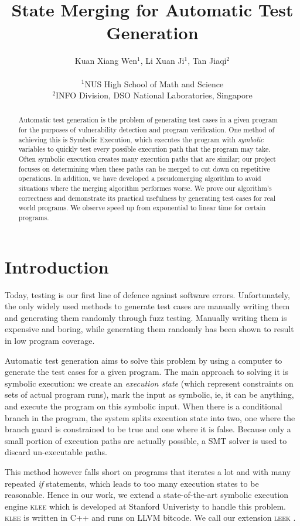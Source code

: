 \documentclass[12pt,a4paper]{article}
\title{State Merging for Automatic Test Generation}
\date{}
\author{
Kuan Xiang Wen$^{1}$, Li Xuan Ji$^{1}$, Tan Jiaqi$^{2}$\\
\vspace{1 mm} \\
\small{$^{1}$NUS High School of Math and Science}\\
\small{$^{2}$INFO Division, DSO National Laboratories, Singapore}
}
\newcommand{\klee}{\textsc{klee }}
\newcommand{\leek}{\textsc{leek }}
\begin{document}
\maketitle
\begin{abstract}
Automatic test generation is the problem of generating test cases in a given program for the purposes of vulnerability detection and program verification. One method of achieving this is Symbolic Execution, which executes the program with \emph{symbolic} variables to quickly test every possible execution path that the program may take. Often symbolic execution creates many execution paths that are similar; our project focuses on determining when these paths can be merged to cut down on repetitive operations. In addition, we have developed a pseudomerging algorithm to avoid situations where the merging algorithm performes worse. We prove our algorithm's correctness and demonstrate its practical usefulness by generating test cases for real world programs. We observe speed up from exponential to linear time for certain programs.
\end{abstract}

\section{Introduction}
Today, testing is our first line of defence against software errors. Unfortunately, the only widely used methods to generate test cases are manually writing them and generating them randomly through fuzz testing. Manually writing them is expensive and boring, while generating them randomly has been shown to result in low program coverage. 

Automatic test generation aims to solve this problem by using a computer to generate the test cases for a given program. The main approach to solving it is symbolic execution: we create an \emph{execution state} (which represent constraints on sets of actual program runs), mark the input as symbolic, ie, it can be anything, and execute the program on this symbolic input. When there is a conditional branch in the program, the system splits execution state into two, one where the branch guard is constrained to be true and one where it is false. Because only a small portion of execution paths are actually possible, a SMT solver is used to discard un-executable paths.

This method however falls short on programs that iterates a lot and with many repeated \emph{if} statements, which leads to too many execution states to be reasonable. Hence in our work, we extend a state-of-the-art symbolic execution engine \klee \cite{klee} which is developed at Stanford Univeristy to handle this problem. \klee is written in C++ and runs on LLVM bitcode. We call our extension \leek.
\end{document}
